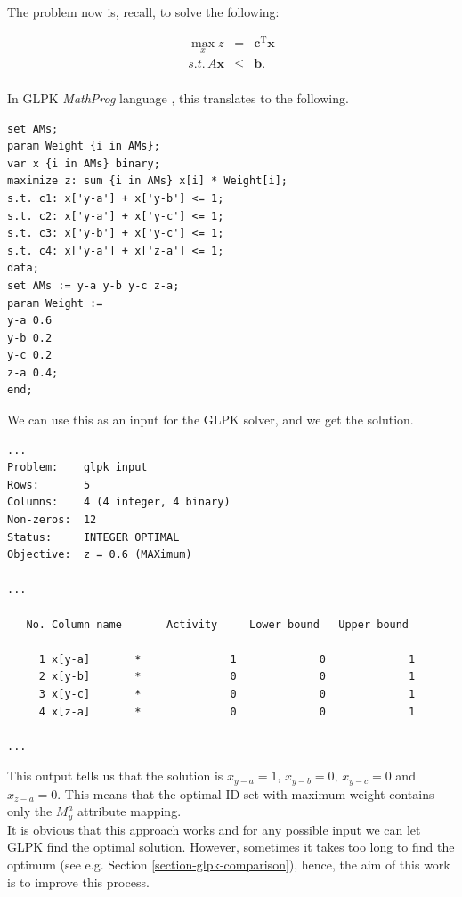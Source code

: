 The problem now is, recall, to solve the following:

\begin{eqnarray*}
\max_{x} z & = & \mathbf{c}^{\mathrm{T}}\mathbf{x} \\
s.t.\, A\mathbf{x} & \leqslant & \mathbf{b}. \\
\end{eqnarray*}

In GLPK \textit{MathProg} language \cite{mathprog}, this translates to the following.

\begin{scriptsize}
\begin{verbatim}
set AMs;
param Weight {i in AMs};
var x {i in AMs} binary;
maximize z: sum {i in AMs} x[i] * Weight[i];
s.t. c1: x['y-a'] + x['y-b'] <= 1;
s.t. c2: x['y-a'] + x['y-c'] <= 1;
s.t. c3: x['y-b'] + x['y-c'] <= 1;
s.t. c4: x['y-a'] + x['z-a'] <= 1;
data;
set AMs := y-a y-b y-c z-a;
param Weight :=
y-a 0.6
y-b 0.2
y-c 0.2
z-a 0.4;
end;
\end{verbatim}
\end{scriptsize}

We can use this as an input for the GLPK solver, and we get the solution.

\begin{scriptsize}
\begin{verbatim}
...
Problem:    glpk_input
Rows:       5
Columns:    4 (4 integer, 4 binary)
Non-zeros:  12
Status:     INTEGER OPTIMAL
Objective:  z = 0.6 (MAXimum)

...

   No. Column name       Activity     Lower bound   Upper bound
------ ------------    ------------- ------------- -------------
     1 x[y-a]       *              1             0             1 
     2 x[y-b]       *              0             0             1 
     3 x[y-c]       *              0             0             1 
     4 x[z-a]       *              0             0             1 

...
\end{verbatim}
\end{scriptsize}

This output tells us that the solution is $x_{y-a} = 1$, $x_{y-b} = 0$, $x_{y-c} = 0$ and $x_{z-a} = 0$. This means that the optimal ID set with maximum weight contains only the $M_{y}^{a}$ attribute mapping.\\

It is obvious that this approach works and for any possible input we can let GLPK find the optimal solution. However, sometimes it takes too long to find the optimum (see e.g. Section \ref{section-glpk-comparison}), hence, the aim of this work is to improve this process.

